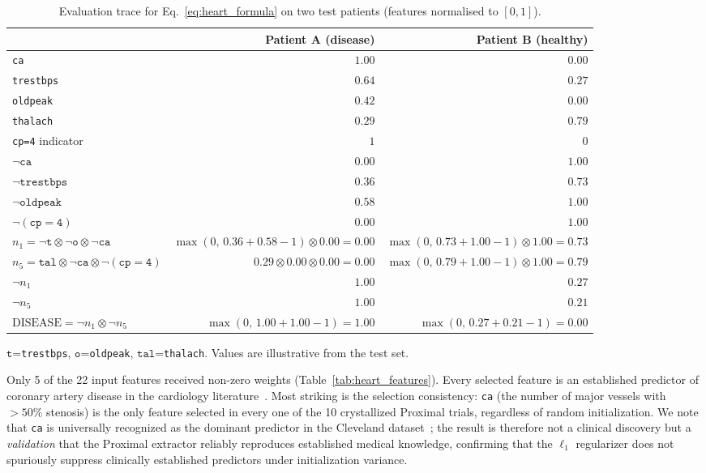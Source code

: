 \documentclass[10pt,a4paper,twoside]{article}
\newcommand{\tnorm}{\otimes}      %
\begin{document}
\begin{table}[h]
\centering
\caption{Evaluation trace for Eq.~\eqref{eq:heart_formula} on two test
patients (features normalised to $[0,1]$).}
\label{tab:heart_trace}
\setlength{\tabcolsep}{5pt}
\begin{tabular}{lrr}
\toprule
 & Patient A (disease) & Patient B (healthy) \\
\midrule
\texttt{ca} & $1.00$ & $0.00$ \\
\texttt{trestbps} & $0.64$ & $0.27$ \\
\texttt{oldpeak} & $0.42$ & $0.00$ \\
\texttt{thalach} & $0.29$ & $0.79$ \\
\texttt{cp=4} indicator & $1$ & $0$ \\
\midrule
$\neg\mathtt{ca}$ & $0.00$ & $1.00$ \\
$\neg\mathtt{trestbps}$ & $0.36$ & $0.73$ \\
$\neg\mathtt{oldpeak}$ & $0.58$ & $1.00$ \\
$\neg(\mathtt{cp{=}4})$ & $0.00$ & $1.00$ \\
\midrule
$n_1 = \neg\mathtt{t} \tnorm \neg\mathtt{o} \tnorm \neg\mathtt{ca}$
  & $\max(0,\,0.36{+}0.58{-}1) \tnorm 0.00 = 0.00$
  & $\max(0,\,0.73{+}1.00{-}1) \tnorm 1.00 = 0.73$ \\
$n_5 = \mathtt{tal} \tnorm \neg\mathtt{ca} \tnorm \neg(\mathtt{cp{=}4})$
  & $0.29 \tnorm 0.00 \tnorm 0.00 = 0.00$
  & $\max(0,\,0.79{+}1.00{-}1) \tnorm 1.00 = 0.79$ \\
\midrule
$\neg n_1$ & $1.00$ & $0.27$ \\
$\neg n_5$ & $1.00$ & $0.21$ \\
$\mathrm{DISEASE} = \neg n_1 \tnorm \neg n_5$
  & $\max(0,\,1.00{+}1.00{-}1) = \mathbf{1.00}$
  & $\max(0,\,0.27{+}0.21{-}1) = \mathbf{0.00}$ \\
\bottomrule
\end{tabular}
\end{table}
{\footnotesize $\mathtt{t}$=\texttt{trestbps}, $\mathtt{o}$=\texttt{oldpeak},
$\mathtt{tal}$=\texttt{thalach}. Values are illustrative from the test set.}

Only 5 of the 22 input features received non-zero weights
(Table~\ref{tab:heart_features}).
Every selected feature is an established predictor of coronary artery disease
in the cardiology literature~\cite{detrano1989,rudin2019}.
Most striking is the selection consistency: \texttt{ca} (the number of major
vessels with $>50\%$ stenosis) is the only feature selected in every one of
the 10 crystallized Proximal trials, regardless of random initialization.
We note that \texttt{ca} is universally recognized as the dominant predictor
in the Cleveland dataset~\cite{detrano1989}; the result is therefore not a
clinical discovery but a \emph{validation} that the Proximal extractor
reliably reproduces established medical knowledge, confirming that the
$\ell_1$ regularizer does not spuriously suppress clinically established
predictors under initialization variance.
\end{document}
